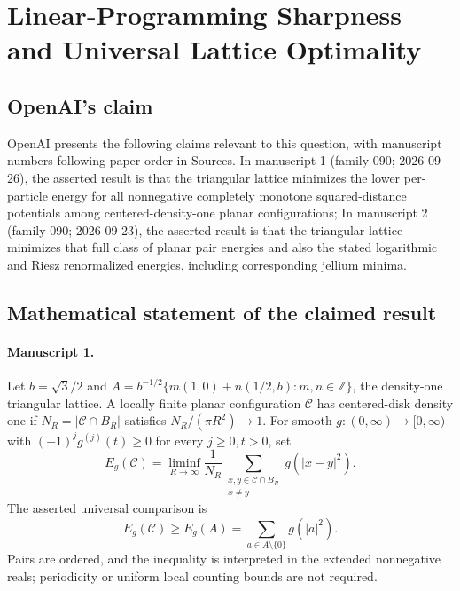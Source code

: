 \documentclass[11pt]{article}
\begin{document}
\section*{Linear-Programming Sharpness and Universal Lattice Optimality}

\subsection{OpenAI's claim}
OpenAI presents the following claims relevant to this question, with manuscript numbers following paper order in Sources. In manuscript 1 (family 090; 2026-09-26), the asserted result is that the triangular lattice minimizes the lower per-particle energy for all nonnegative completely monotone squared-distance potentials among centered-density-one planar configurations; In manuscript 2 (family 090; 2026-09-23), the asserted result is that the triangular lattice minimizes that full class of planar pair energies and also the stated logarithmic and Riesz renormalized energies, including corresponding jellium minima.

\subsection{Mathematical statement of the claimed result}
\paragraph{Manuscript 1.}
Let $b=\sqrt3/2$ and $A=b^{-1/2}\{m(1,0)+n(1/2,b):m,n\in\mathbb Z\}$, the density-one triangular lattice. A locally finite planar configuration $\mathcal C$ has centered-disk density one if $N_R=|\mathcal C\cap B_R|$ satisfies $N_R/(\pi R^2)\to1$. For smooth $g:(0,\infty)\to[0,\infty)$ with $(-1)^jg^{(j)}(t)\ge0$ for every $j\ge0,t>0$, set
\[
 E_g(\mathcal C)=\liminf_{R\to\infty}\frac1{N_R}
 \sum_{\substack{x,y\in\mathcal C\cap B_R\\x\ne y}}g(|x-y|^2).
\]
The asserted universal comparison is
\[
 E_g(\mathcal C)\ge E_g(A)=\sum_{a\in A\setminus\{0\}}g(|a|^2).
\]
Pairs are ordered, and the inequality is interpreted in the extended nonnegative reals; periodicity or uniform local counting bounds are not required.
\end{document}
